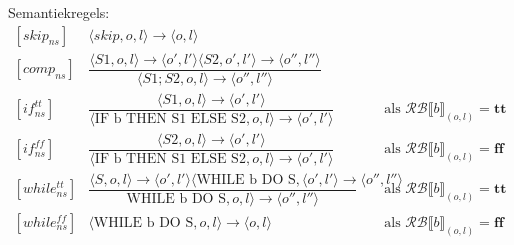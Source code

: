 \documentclass[12pt]{article}
\newcommand{\RB}{\mathcal{RB}}
\begin{document}
Semantiekregels:\\
\renewcommand*{\arraystretch}{2.5}
\[
\begin{matrix}
[skip_{ns}]  & \langle skip, o, l \rangle \rightarrow \langle o, l \rangle\\
[comp_{ns}]  & \dfrac{\langle S1, o, l \rangle \rightarrow \langle o', l' \rangle \langle S2, o', l' \rangle \rightarrow \langle o'', l'' \rangle}{\langle S1;S2, o, l \rangle \rightarrow \langle o'', l'' \rangle}\\
[if_{ns}^{tt}] & \dfrac{\langle S1, o, l \rangle \rightarrow \langle o', l' \rangle}{\langle \mbox{IF b THEN S1 ELSE S2}, o, l \rangle \rightarrow \langle o', l' \rangle} &&\mbox{ als }\RB \llbracket b \rrbracket_{(o,l)} = \boldsymbol{tt}\\
[if_{ns}^{ff}] & \dfrac{\langle S2, o, l \rangle \rightarrow \langle o', l' \rangle}{\langle \mbox{IF b THEN S1 ELSE S2}, o, l \rangle \rightarrow \langle o', l' \rangle} &&\mbox{ als }\RB \llbracket b \rrbracket_{(o,l)} = \boldsymbol{ff}\\
[while_{ns}^{tt}] & \dfrac{\langle S, o, l \rangle \rightarrow \langle o', l' \rangle \langle \mbox{WHILE b DO S}, \langle o', l' \rangle \rightarrow \langle o'',l'' \rangle}{\mbox{WHILE b DO S}, o, l \rangle \rightarrow \langle o'',l'' \rangle} &&\mbox{ als }\RB \llbracket b \rrbracket_{(o,l)} = \boldsymbol{tt}\\
[while_{ns}^{ff}] & \langle \mbox{WHILE b DO S}, o, l \rangle \rightarrow \langle o,l \rangle &&\mbox{ als }\RB \llbracket b \rrbracket_{(o,l)} = \boldsymbol{ff}\\
\end{matrix}
\]
\end{document}
